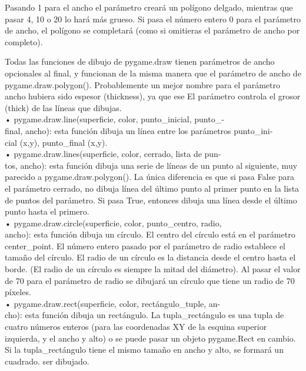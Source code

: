 Pasando 1 para el ancho el parámetro creará un polígono delgado, mientras que pasar 4, 10 o 20 lo hará más grueso.
Si pasa el número entero 0 para el parámetro de ancho, el polígono se completará (como si omitieras el parámetro de ancho por completo).

Todas las funciones de dibujo de {\ttfamily pygame.draw} tienen parámetros de ancho opcionales al final,
y funcionan de la misma manera que el parámetro de ancho de {\ttfamily pygame.draw.polygon()}.
Probablemente un mejor nombre para el parámetro ancho hubiera sido espesor (thickness), ya que ese
El parámetro controla el grosor (thick) de las líneas que dibujas.\\

• {\ttfamily pygame.draw.line(superficie, color, punto\_inicial, punto\_- \\ final, ancho)}: esta función dibuja un
línea entre los parámetros {\ttfamily punto\_ini- \\cial (x,y), punto\_final (x,y)}. \\

• {\ttfamily pygame.draw.lines(superficie, color, cerrado, lista de pun- \\ tos, ancho)}: esta función dibuja una serie
de líneas de un punto al siguiente, muy parecido a  {\ttfamily pygame.draw.polygon()}. La única diferencia es que si pasa {\ttfamily False} para el parámetro cerrado, no dibuja línea del último punto al primer punto en la lista de puntos del parámetro. Si pasa {\ttfamily True}, entonces dibuja una línea desde el último punto hasta el primero.\\


• {\ttfamily pygame.draw.circle(superficie, color, punto\_centro, radio,\\ ancho)}: esta función dibuja un
círculo. El centro del círculo está en el parámetro center\_point. El número entero pasado por
el parámetro de radio establece el tamaño del círculo. El radio de un círculo es la distancia desde el centro hasta el borde. 
(El radio de un círculo es siempre la mitad del diámetro). Al pasar el valor de 70  para el parámetro de radio se dibujará un círculo que
tiene un radio de 70 píxeles.\\


• {\ttfamily pygame.draw.rect(superficie, color, rectángulo\_tuple, an- \\ cho)}: esta función dibuja un
rectángulo. La tupla\_rectángulo es una tupla de cuatro números enteros (para las coordenadas XY
de la esquina superior izquierda, y el ancho y alto) o se puede pasar un objeto pygame.Rect
en cambio. Si la tupla\_rectángulo tiene el mismo tamaño en ancho y alto, se formará un cuadrado.
ser dibujado.\\

